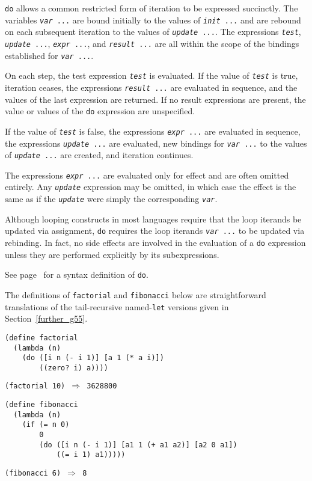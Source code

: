 \texttt{do} allows a common restricted form of \label{control_s26}iteration
to be expressed succinctly.
The variables \texttt{\textit{var} ...} are bound initially to the
values of \texttt{\textit{init} ...} and are rebound on each subsequent
iteration to the values of \texttt{\textit{update} ...}.
The expressions \texttt{\textit{test}}, 
\texttt{\textit{update} ...},
\texttt{\textit{expr} ...}, and
\texttt{\textit{result} ...}
are all within the scope of the bindings
established for \texttt{\textit{var} ...}.

On each step, the test expression \texttt{\textit{test}} is evaluated.
If the value of \texttt{\textit{test}} is true, iteration ceases,
the expressions \texttt{\textit{result} ...} are evaluated in
sequence, and the values of the last expression are returned.
If no result expressions are present, the value or values of the \texttt{do}
expression are unspecified.


If the value of \texttt{\textit{test}} is false, the expressions \texttt{\textit{expr} ...}
are evaluated in sequence, the expressions \texttt{\textit{update} ...} are
evaluated, new bindings for \texttt{\textit{var} ...} to the values of
\texttt{\textit{update} ...} are created, and iteration continues.


The expressions \texttt{\textit{expr} ...} are evaluated only for effect
and are often omitted entirely.
Any \texttt{\textit{update}} expression may be omitted, in which case the effect is
the same as if the \texttt{\textit{update}} were simply the corresponding
\texttt{\textit{var}}.


Although looping constructs in most languages require that the loop
iterands be updated via assignment, \texttt{do} requires the loop
iterands \texttt{\textit{var} ...} to be updated via rebinding.
In fact, no side effects are involved in the evaluation of a
\texttt{do} expression unless they are performed explicitly by its
subexpressions.


See page \pageref{syntax_defn_do} for a syntax definition of \texttt{do}.


The definitions of \label{control_s27}\texttt{factorial} and \label{control_s28}\texttt{fibonacci} below are
straightforward translations of the tail-recursive named-\texttt{let} versions
given in Section \ref{further_g55}.


\begin{alltt}
(define factorial
  (lambda (n)
    (do ([i n (- i 1)] [a 1 (* a i)])
        ((zero? i) a))))

(factorial 10) \(\Rightarrow\) 3628800

(define fibonacci
  (lambda (n)
    (if (= n 0)
        0
        (do ([i n (- i 1)] [a1 1 (+ a1 a2)] [a2 0 a1])
            ((= i 1) a1)))))

(fibonacci 6) \(\Rightarrow\) 8
\end{alltt}


